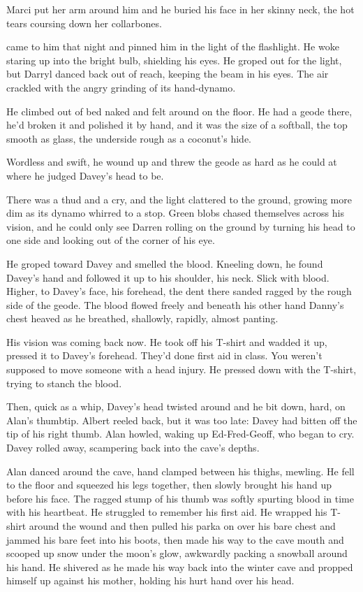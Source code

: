 Marci put her arm around him and he buried his face in her skinny
neck, the hot tears coursing down her collarbones.

 came to him that night and pinned him in the light of the
flashlight.  He woke staring up into the bright bulb, shielding his
eyes.  He groped out for the light, but Darryl danced back out of
reach, keeping the beam in his eyes.  The air crackled with the angry
grinding of its hand-dynamo.

He climbed out of bed naked and felt around on the floor.  He had a
geode there, he'd broken it and polished it by hand, and it was the
size of a softball, the top smooth as glass, the underside rough as a
coconut's hide.

Wordless and swift, he wound up and threw the geode as hard as he
could at where he judged Davey's head to be.

There was a thud and a cry, and the light clattered to the ground,
growing more dim as its dynamo whirred to a stop.  Green blobs chased
themselves across his vision, and he could only see Darren rolling on
the ground by turning his head to one side and looking out of the
corner of his eye.

He groped toward Davey and smelled the blood.  Kneeling down, he found
Davey's hand and followed it up to his shoulder, his neck.  Slick with
blood.  Higher, to Davey's face, his forehead, the dent there sanded
ragged by the rough side of the geode.  The blood flowed freely and
beneath his other hand Danny's chest heaved as he breathed, shallowly,
rapidly, almost panting.

His vision was coming back now.  He took off his T-shirt and wadded it
up, pressed it to Davey's forehead.  They'd done first aid in class. 
You weren't supposed to move someone with a head injury.  He pressed
down with the T-shirt, trying to stanch the blood.

Then, quick as a whip, Davey's head twisted around and he bit down,
hard, on Alan's thumbtip.  Albert reeled back, but it was too late: 
Davey had bitten off the tip of his right thumb.  Alan howled, waking
up Ed-Fred-Geoff, who began to cry.  Davey rolled away, scampering
back into the cave's depths.

Alan danced around the cave, hand clamped between his thighs, mewling. 
He fell to the floor and squeezed his legs together, then slowly
brought his hand up before his face.  The ragged stump of his thumb
was softly spurting blood in time with his heartbeat.  He struggled to
remember his first aid.  He wrapped his T-shirt around the wound and
then pulled his parka on over his bare chest and jammed his bare feet
into his boots, then made his way to the cave mouth and scooped up
snow under the moon's glow, awkwardly packing a snowball around his
hand.  He shivered as he made his way back into the winter cave and
propped himself up against his mother, holding his hurt hand over his
head.

